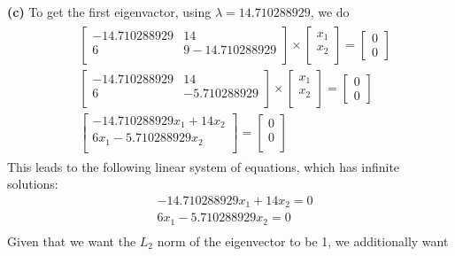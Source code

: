 \documentclass[leqno]{article}
\begin{document}
\noindent \textbf{(c)} To get the first eigenvactor, using $\lambda = 14.710288929$, we do
\begin{gather*}
\begin{split}
&\begin{bmatrix}
    -14.710288929 & 14 \\
    6 & 9 - 14.710288929\\  
\end{bmatrix} \times \begin{bmatrix}
   x_1\\
   x_2\\
\end{bmatrix} =
\begin{bmatrix}
   0\\
   0
\end{bmatrix}
\\
&\begin{bmatrix}
    -14.710288929 & 14 \\
    6 & -5.710288929\\  
\end{bmatrix} \times \begin{bmatrix}
   x_1\\
   x_2\\
\end{bmatrix} =
\begin{bmatrix}
   0\\
   0
\end{bmatrix}
\\
&\begin{bmatrix}
    -14.710288929x_1 + 14x_2 \\
    6x_1  -5.710288929x_2\\  
\end{bmatrix} =
\begin{bmatrix}
   0\\
   0\\
\end{bmatrix}
\end{split}
\end{gather*}
This leads to the following linear system of equations, which has infinite solutions:
\begin{equation*}
\begin{split}
&-14.710288929x_1 + 14x_2 = 0\\
&6x_1  -5.710288929x_2 = 0\\  
\end{split}
\end{equation*}
Given that we want the $L_2$ norm of the eigenvector to be 1, we additionally want
\end{document}
